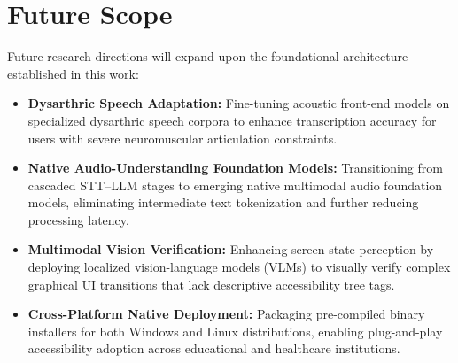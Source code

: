 \documentclass[12pt,a4paper]{report}
\begin{document}
\section{Future Scope}
Future research directions will expand upon the foundational architecture established in this work:
\begin{itemize}
    \item \textbf{Dysarthric Speech Adaptation:} Fine-tuning acoustic front-end models on specialized dysarthric speech corpora to enhance transcription accuracy for users with severe neuromuscular articulation constraints.
    \item \textbf{Native Audio-Understanding Foundation Models:} Transitioning from cascaded STT--LLM stages to emerging native multimodal audio foundation models, eliminating intermediate text tokenization and further reducing processing latency.
    \item \textbf{Multimodal Vision Verification:} Enhancing screen state perception by deploying localized vision-language models (VLMs) to visually verify complex graphical UI transitions that lack descriptive accessibility tree tags.
    \item \textbf{Cross-Platform Native Deployment:} Packaging pre-compiled binary installers for both Windows and Linux distributions, enabling plug-and-play accessibility adoption across educational and healthcare institutions.
\end{itemize}


\newpage
\end{document}
